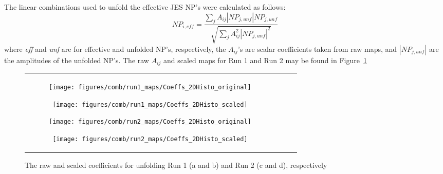 The linear combinations used to unfold the effective JES NP's were calculated as follows:
\begin{equation}
NP_{i,eff} = \frac{\sum_j A_{ij} \left|NP_{j,unf}\right| NP_{j,unf}}{\sqrt{\sum_j A_{ij}^2 \left|NP_{j,unf}\right|^2 }}
\end{equation}
where \textit{eff} and \textit{unf} are for effective and unfolded NP's, respectively, the $A_{ij}$'s are scalar coefficients taken from raw maps, and $\left|NP_{j,unf}\right|$ are the amplitudes of the unfolded NP's.  The raw $A_{ij}$ and scaled maps for Run 1 and Run 2 may be found in Figure~\ref{fig:comb_jes_maps}


\begin{figure}[!htbp]\captionsetup{justification=centering}
  \centering
  \begin{tabular}{cccc}
\begin{subfigure}[t]{0.24\textwidth}\centering\texttt{[image: figures/comb/run1\_maps/Coeffs\_2DHisto\_original]}\caption{}\end{subfigure}
\begin{subfigure}[t]{0.24\textwidth}\centering\texttt{[image: figures/comb/run1\_maps/Coeffs\_2DHisto\_scaled]}\caption{}\end{subfigure}
\begin{subfigure}[t]{0.24\textwidth}\centering\texttt{[image: figures/comb/run2\_maps/Coeffs\_2DHisto\_original]}\caption{}\end{subfigure}
\begin{subfigure}[t]{0.24\textwidth}\centering\texttt{[image: figures/comb/run2\_maps/Coeffs\_2DHisto\_scaled]}\caption{}\end{subfigure}
    \end{tabular}
    \caption{The raw and scaled coefficients for unfolding Run 1 (a and b) and Run 2 (c and d), respectively}
    \label{fig:comb_jes_maps}
\end{figure}


